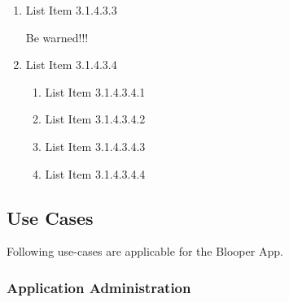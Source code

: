 \documentclass{article}%
\makeatletter
\newcommand{\savecurrentfontsize}{\let\savedlastfontsize\@currsize}
\makeatother
\begin{document}
\begin{enumerate}
\begin{enumerate}
\begin{enumerate}
\par%
\item%
\hypertarget{ID:1400279293}{}%
List Item 3.1.4.3.2.5%
\par%
\item%
\hypertarget{ID:1413039099}{}%
List Item 3.1.4.3.2.6%
\par%
\end{enumerate}%
\item%
\hypertarget{ID:1554918225}{}%
List Item 3.1.4.3.3%
\par%
\savecurrentfontsize%
\begin{mdframed}[style=StopFrame,skipabove=\baselineskip]%
Be warned!!!%
\end{mdframed}%
\savedlastfontsize%
\item%
\hypertarget{ID:708635400}{}%
List Item 3.1.4.3.4%
\par%
\begin{enumerate}%
\item%
\hypertarget{ID:1989216770}{}%
List Item 3.1.4.3.4.1%
\par%
\item%
\hypertarget{ID:1585531178}{}%
List Item 3.1.4.3.4.2%
\par%
\item%
\hypertarget{ID:1275196467}{}%
List Item 3.1.4.3.4.3%
\par%
\item%
\hypertarget{ID:1237255028}{}%
List Item 3.1.4.3.4.4%
\par%
\end{enumerate}%
\end{enumerate}%
\end{enumerate}%
\hypertarget{ID:1081154953}{}%
\subsection{Use Cases}%

%
Following use{-}cases are applicable for the Blooper App.%
\hypertarget{ID:1478186642}{}%
\subsubsection{Application Administration}%
\end{document}
